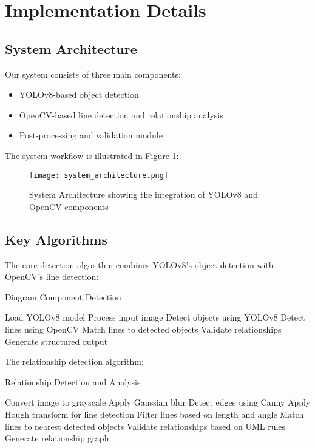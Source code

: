 \documentclass[conference]{IEEEtran}
\begin{document}
\section{Implementation Details}

\subsection{System Architecture}
Our system consists of three main components:
\begin{itemize}
\item YOLOv8-based object detection
\item OpenCV-based line detection and relationship analysis
\item Post-processing and validation module
\end{itemize}

The system workflow is illustrated in Figure \ref{fig:system_architecture}:

\begin{figure}[H]
\centering
\texttt{[image: system\_architecture.png]}
\caption{System Architecture showing the integration of YOLOv8 and OpenCV components}
\label{fig:system_architecture}
\end{figure}

\subsection{Key Algorithms}
The core detection algorithm combines YOLOv8's object detection with OpenCV's line detection:

\begin{algorithm}[H]
\caption{Diagram Component Detection}
\begin{algorithmic}[1]
\STATE Load YOLOv8 model
\STATE Process input image
\STATE Detect objects using YOLOv8
\STATE Detect lines using OpenCV
\STATE Match lines to detected objects
\STATE Validate relationships
\STATE Generate structured output
\end{algorithmic}
\end{algorithm}

The relationship detection algorithm:
\begin{algorithm}[H]
\caption{Relationship Detection and Analysis}
\begin{algorithmic}[1]
\STATE Convert image to grayscale
\STATE Apply Gaussian blur
\STATE Detect edges using Canny
\STATE Apply Hough transform for line detection
\STATE Filter lines based on length and angle
\STATE Match lines to nearest detected objects
\STATE Validate relationships based on UML rules
\STATE Generate relationship graph
\end{algorithmic}
\end{algorithm}
\end{document}
